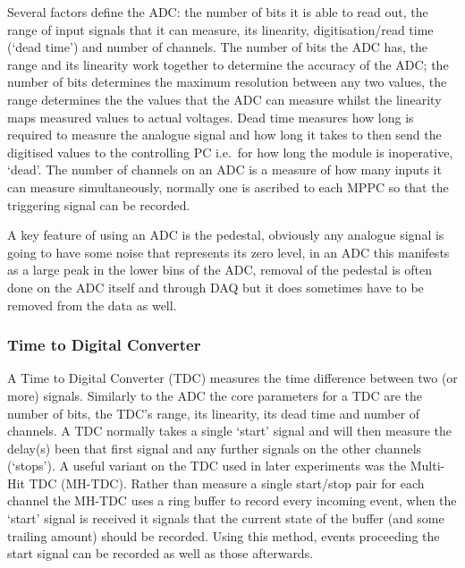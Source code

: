 Several factors define the ADC: the number of bits it is able to read out, the range of input signals that it can measure, its linearity, digitisation/read time (`dead time') and number of channels. The number of bits the ADC has, the range and its linearity work together to determine the accuracy of the ADC; the number of bits determines the maximum resolution between any two values, the range determines the the values that the ADC can measure whilst the linearity maps measured values to actual voltages. Dead time measures how long is required to measure the analogue signal and how long it takes to then send the digitised values to the controlling PC i.e.\ for how long the module is inoperative, `dead'. The number of channels on an ADC is a measure of how many inputs it can measure simultaneously, normally one is ascribed to each MPPC so that the triggering signal can be recorded.

A key feature of using an ADC is the pedestal, obviously any analogue signal is going to have some noise that represents its zero level, in an ADC this manifests as a large peak in the lower bins of the ADC, removal of the pedestal is often done on the ADC itself and through DAQ but it does sometimes have to be removed from the data as well.

\subsubsection{Time to Digital Converter} %
\label{ssub:time_to_digital_converter}
A Time to Digital Converter (TDC) measures the time difference between two (or more) signals. Similarly to the ADC the core parameters for a TDC are the number of bits, the TDC's range, its linearity, its dead time and number of channels. A TDC normally takes a single `start' signal and will then measure the delay(s) been that first signal and any further signals on the other channels (`stops'). A useful variant on the TDC used in later experiments was the Multi-Hit TDC (MH-TDC). Rather than measure a single start/stop pair for each channel the MH-TDC uses a ring buffer to record every incoming event, when the `start' signal is received it signals that the current state of the buffer (and some trailing amount) should be recorded. Using this method, events proceeding the start signal can be recorded as well as those afterwards.

